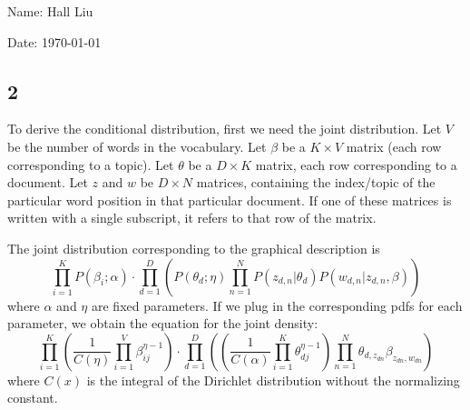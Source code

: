 \documentclass{article}
\begin{document}
Name: Hall Liu

Date: \today 
\vspace{1.5cm}
\subsection*{2}
To derive the conditional distribution, first we need the joint distribution. Let $V$ be the number of words in the vocabulary. Let $\beta$ be a $K\times V$ matrix (each row corresponding to a topic). Let $\theta$ be a $D\times K$ matrix, each row corresponding to a document. Let $z$ and $w$ be $D\times N$ matrices, containing the index/topic of the particular word position in that particular document. If one of these matrices is written with a single subscript, it refers to that row of the matrix.

The joint distribution corresponding to the graphical description is
\[\prod_{i=1}^KP(\beta_i;\alpha)\cdot\prod_{d=1}^D\left(P(\theta_d;\eta)\prod_{n=1}^NP(z_{d,n}|\theta_d)P(w_{d,n}|z_{d,n},\beta)\right)\]
where $\alpha$ and $\eta$ are fixed parameters. If we plug in the corresponding pdfs for each parameter, we obtain the equation for the joint density:
\[\prod_{i=1}^K\left(\frac{1}{C(\eta)}\prod_{i=1}^V\beta_{ij}^{\eta-1}\right)\cdot\prod_{d=1}^D\left(\left(\frac{1}{C(\alpha)}\prod_{i=1}^K\theta_{dj}^{\eta-1}\right)\prod_{n=1}^N\theta_{d,z_{dn}}\beta_{z_{dn},w_{dn}}\right)\]
where $C(x)$ is the integral of the Dirichlet distribution without the normalizing constant.
\end{document}
